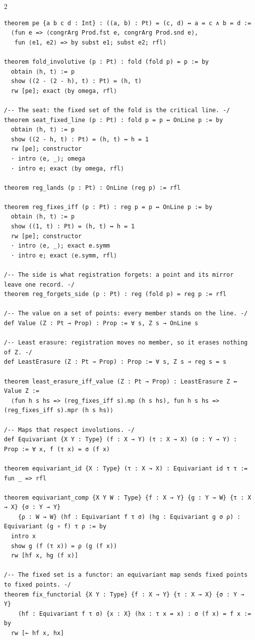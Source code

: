 \documentclass[10pt]{article}
\begin{document}
\begin{multicols}{2}
\begin{Verbatim}[fontsize=\fontsize{6.2}{7.2}\selectfont,breaklines,breakanywhere,breaksymbolleft={}]
theorem pe {a b c d : Int} : ((a, b) : Pt) = (c, d) ↔ a = c ∧ b = d :=
  ⟨fun e => ⟨congrArg Prod.fst e, congrArg Prod.snd e⟩,
   fun ⟨e1, e2⟩ => by subst e1; subst e2; rfl⟩

theorem fold_involutive (p : Pt) : fold (fold p) = p := by
  obtain ⟨h, t⟩ := p
  show ((2 - (2 - h), t) : Pt) = (h, t)
  rw [pe]; exact ⟨by omega, rfl⟩

/-- The seat: the fixed set of the fold is the critical line. -/
theorem seat_fixed_line (p : Pt) : fold p = p ↔ OnLine p := by
  obtain ⟨h, t⟩ := p
  show ((2 - h, t) : Pt) = (h, t) ↔ h = 1
  rw [pe]; constructor
  · intro ⟨e, _⟩; omega
  · intro e; exact ⟨by omega, rfl⟩

theorem reg_lands (p : Pt) : OnLine (reg p) := rfl

theorem reg_fixes_iff (p : Pt) : reg p = p ↔ OnLine p := by
  obtain ⟨h, t⟩ := p
  show ((1, t) : Pt) = (h, t) ↔ h = 1
  rw [pe]; constructor
  · intro ⟨e, _⟩; exact e.symm
  · intro e; exact ⟨e.symm, rfl⟩

/-- The side is what registration forgets: a point and its mirror leave one record. -/
theorem reg_forgets_side (p : Pt) : reg (fold p) = reg p := rfl

/-- The value on a set of points: every member stands on the line. -/
def Value (Z : Pt → Prop) : Prop := ∀ s, Z s → OnLine s

/-- Least erasure: registration moves no member, so it erases nothing of Z. -/
def LeastErasure (Z : Pt → Prop) : Prop := ∀ s, Z s → reg s = s

theorem least_erasure_iff_value (Z : Pt → Prop) : LeastErasure Z ↔ Value Z :=
  ⟨fun h s hs => (reg_fixes_iff s).mp (h s hs), fun h s hs => (reg_fixes_iff s).mpr (h s hs)⟩

/-- Maps that respect involutions. -/
def Equivariant {X Y : Type} (f : X → Y) (τ : X → X) (σ : Y → Y) : Prop := ∀ x, f (τ x) = σ (f x)

theorem equivariant_id {X : Type} (τ : X → X) : Equivariant id τ τ := fun _ => rfl

theorem equivariant_comp {X Y W : Type} {f : X → Y} {g : Y → W} {τ : X → X} {σ : Y → Y}
    {ρ : W → W} (hf : Equivariant f τ σ) (hg : Equivariant g σ ρ) : Equivariant (g ∘ f) τ ρ := by
  intro x
  show g (f (τ x)) = ρ (g (f x))
  rw [hf x, hg (f x)]

/-- The fixed set is a functor: an equivariant map sends fixed points to fixed points. -/
theorem fix_functorial {X Y : Type} {f : X → Y} {τ : X → X} {σ : Y → Y}
    (hf : Equivariant f τ σ) {x : X} (hx : τ x = x) : σ (f x) = f x := by
  rw [← hf x, hx]


\end{Verbatim}
\end{multicols}
\end{document}
